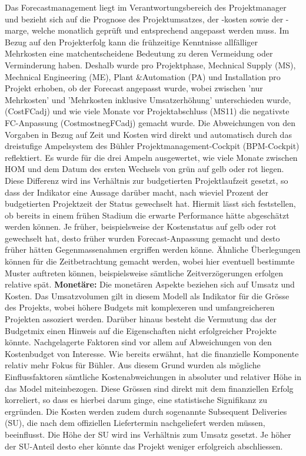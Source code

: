 \newline Das  Forecastmanagement liegt im Verantwortungsbereich des Projektmanager und bezieht sich auf die Prognose des Projektumsatzes, der -kosten sowie der -marge, welche monatlich geprüft und entsprechend angepasst werden muss. Im Bezug auf den Projekterfolg kann die frühzeitige Kenntnisse allfälliger Mehrkosten eine matchentscheidene Bedeutung zu deren Vermeidung oder Verminderung haben. Deshalb wurde pro Projektphase, Mechnical Supply (MS), Mechnical Engineering (ME), Plant \&Automation (PA) und Installation pro Projekt erhoben, ob der Forecast angepasst wurde, wobei zwischen 'nur Mehrkosten' und 'Mehrkosten inklusive Umsatzerhöhung' unterschieden wurde, (CostFCadj) und wie viele Monate vor Projektabschluss (MS11) die negativste FC-Anpassung (CostmostnegFCadj) gemacht wurde. Die Abweichungen von den Vorgaben in Bezug auf Zeit und Kosten wird direkt und automatisch durch das dreistufige Ampelsystem des Bühler Projektmanagement-Cockpit (BPM-Cockpit) reflektiert. Es wurde für die drei Ampeln ausgewertet, wie viele Monate zwischen HOM und dem Datum des ersten Wechsels von grün auf gelb oder rot liegen. Diese Differenz wird ins Verhältnis zur budgetierten Projektlaufzeit gesetzt, so dass der Indikator eine Aussage darüber macht, nach wieviel Prozent der budgetierten Projektzeit der Status gewechselt hat. Hiermit lässt sich feststellen, ob bereits in einem frühen Stadium die erwarte Performance hätte abgeschätzt werden können. Je früher, beispielsweise der Kostenstatus auf gelb oder rot gewechselt hat, desto früher wurden Forecast-Anpassung gemacht und desto früher hätten Gegenmassenahmen ergriffen werden könne. Ähnliche Überlegungen können für die Zeitbetrachtung gemacht werden, wobei hier eventuell bestimmte Muster auftreten können, beispielsweise sämtliche Zeitverzögerungen erfolgen relative spät. 
\newline\newline\textbf{Monetäre:} Die monetären Aspekte beziehen sich auf Umsatz und Kosten. Das Umsatzvolumen gilt in diesem Modell als Indikator für die Grösse des Projekts, wobei höhere Budgets mit komplexeren und umfangreicheren Projekten assoziert werden. Darüber hinaus besteht die Vermutung das der Budgetmix einen Hinweis auf die Eigenschaften nicht erfolgreicher Projekte könnte.
\newline Nachgelagerte Faktoren sind vor allem auf Abweichungen von den Kostenbudget von Interesse. Wie bereits erwähnt, hat die finanzielle Komponente relativ mehr Fokus für Bühler. Aus diesem Grund wurden als mögliche Einflussfaktoren sämtliche Kostenabweichungen in absoluter und relativer Höhe in das Model miteinbezogen. Diese Grössen sind direkt mit dem finanziellen Erfolg korreliert, so dass es hierbei darum ginge, eine statistische Signifikanz zu ergründen. Die Kosten werden zudem durch sogenannte Subsequent Deliveries (SU), die nach dem offiziellen Liefertermin nachgeliefert werden müssen, beeinflusst. Die Höhe der SU wird ins Verhältnis zum Umsatz gesetzt. Je höher der SU-Anteil desto eher könnte das Projekt weniger erfolgreich abschliessen.
